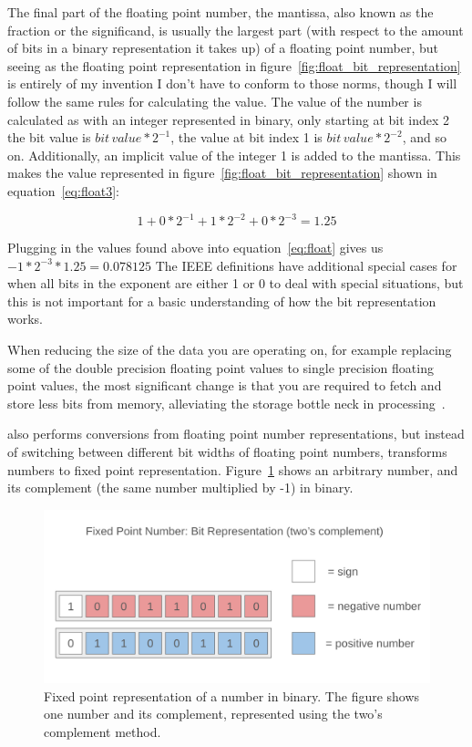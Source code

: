 The final part of the floating point number, the mantissa, also known as the fraction or the significand, is usually the largest part (with respect to the amount of bits in a binary representation it takes up) of a floating point number, but seeing as the floating point representation in figure~\ref{fig:float_bit_representation} is entirely of my invention I don't have to conform to those norms, though I will follow the same rules for calculating the value.
The value of the number is calculated as with an integer represented in binary, only starting at bit index 2 the bit value is $bit\,value*2^{-1}$, the value at bit index 1 is $bit\,value*2^{-2}$, and so on. Additionally, an implicit value of the integer 1 is added to the mantissa. This makes the value represented in figure~\ref{fig:float_bit_representation} shown in equation~\ref{eq:float3}:

\begin{equation}\label{eq:float3}
   1 + 0*2^{-1} + 1*2^{-2} + 0*2^{-3} = 1.25
\end{equation}

Plugging in the values found above into equation~\ref{eq:float} gives us $-1 * 2^{-3} * 1.25 = 0.078125$
The IEEE definitions have additional special cases for when all bits in the exponent are either 1 or 0 to deal with special situations, but this is not important for a basic understanding of how the bit representation works.

When reducing the size of the data you are operating on, for example replacing some of the double precision floating point values to single precision floating point values, the most significant change is that you are required to fetch and store less bits from memory, alleviating the storage bottle neck in processing~\citep{floatsmith_paper}.

\taffo{} also performs conversions from floating point number representations, but instead of switching between different bit widths of floating point numbers, \taffo{} transforms numbers to fixed point representation. Figure~\ref{fig:fixed_point_representation} shows an arbitrary number, and its complement (the same number multiplied by -1) in binary.

\begin{figure}
    \centering
    \includegraphics[width=0.5\linewidth]{Images/fixed_point_bit_representation.png}
    \caption{Fixed point representation of a number in binary. The figure shows one number and its complement, represented using the two's complement method.}
    \label{fig:fixed_point_representation}
\end{figure}

